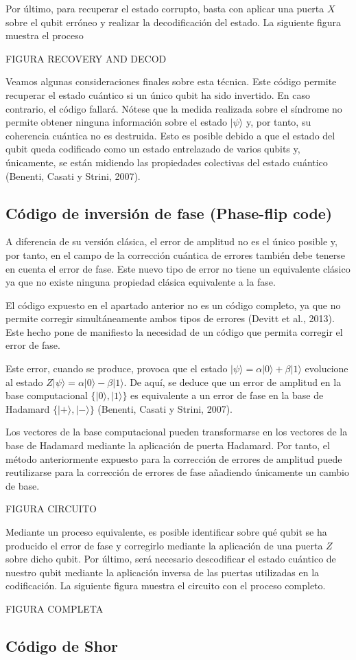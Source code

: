Por último, para recuperar el estado corrupto, basta con aplicar una puerta $X$ sobre el qubit erróneo y realizar la decodificación del estado. La siguiente figura muestra el proceso

FIGURA RECOVERY AND DECOD

Veamos algunas consideraciones finales sobre esta técnica. Este código permite recuperar el estado cuántico si un único qubit ha sido invertido. En caso contrario, el código fallará. Nótese que la medida realizada sobre el síndrome no permite obtener ninguna información sobre el estado $ | \psi \rangle $ y, por tanto, su coherencia cuántica no es destruida. Esto es posible debido a que el estado del qubit queda codificado como un estado entrelazado de varios qubits y, únicamente, se están midiendo las propiedades colectivas del estado cuántico (Benenti, Casati y Strini, 2007).

\subsection{Código de inversión de fase (Phase-flip code)}

A diferencia de su versión clásica, el error de amplitud no es el único posible y, por tanto, en el campo de la corrección cuántica de errores también debe tenerse en cuenta el error de fase. Este nuevo tipo de error no tiene un equivalente clásico ya que no existe ninguna propiedad clásica equivalente a la fase. 

El código expuesto en el apartado anterior no es un código completo, ya que no permite corregir simultáneamente ambos tipos de errores (Devitt et al., 2013). Este hecho pone de manifiesto la necesidad de un código que permita corregir el error de fase. 

Este error, cuando se produce, provoca que el estado $ | \psi \rangle = \alpha | 0 \rangle + \beta | 1 \rangle$ evolucione al estado $Z | \psi \rangle = \alpha | 0 \rangle - \beta | 1 \rangle $. De aquí, se deduce que un error de amplitud en la base computacional $ \{ | 0 \rangle, | 1 \rangle  \}$ es equivalente a un error de fase en la base de Hadamard  $ \{ | + \rangle, | - \rangle  \}$ (Benenti, Casati y Strini, 2007).

Los vectores de la base computacional pueden transformarse en los vectores de la base de Hadamard mediante la aplicación de puerta Hadamard. Por tanto, el método anteriormente expuesto para la corrección de errores de amplitud puede reutilizarse para la corrección de errores de fase añadiendo únicamente un cambio de base.

FIGURA CIRCUITO

Mediante un proceso equivalente, es posible identificar sobre qué qubit se ha producido el error de fase y corregirlo mediante la aplicación de una puerta $Z$ sobre dicho qubit. Por último, será necesario descodificar el estado cuántico de nuestro qubit mediante la aplicación inversa de las puertas utilizadas en la codificación. La siguiente figura muestra el circuito con el proceso completo. 

FIGURA COMPLETA 

\subsection{Código de Shor}